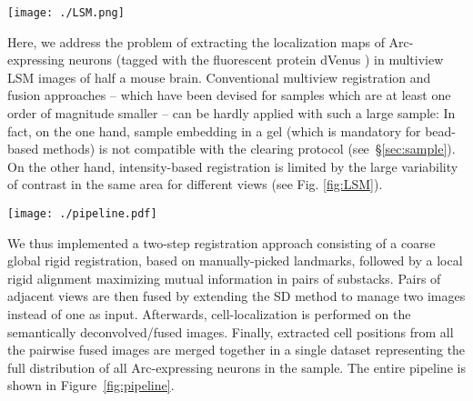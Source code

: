 \documentclass[smallextended]{svjour3}       %
\begin{document}
\begin{figure*}
\centering
\texttt{[image: ./LSM.png]}
\caption{Image degradation in LSM. (a) both excitation (solid arrow) and fluorescence light (dashed arrow)
are scattered and absorbed while traveling inside the specimen, leading to image degradation along two
orthogonal axes. (b) virtual coronal sections of half a mouse brain imaged with LSM at different angles.
The direction of the ingoing excitation light and of the outgoing fluorescence are depicted with solid and
dashed arrows, respectively. Scale bars, 1 mm.}
\label{fig:LSM}
\end{figure*}

Here, we address the problem of extracting the localization maps of Arc-expressing neurons (tagged with
the fluorescent protein dVenus \cite{eguchi_vivo_2009}) in multiview LSM images of half a mouse brain.
Conventional multiview registration and fusion approaches -- which have been devised for samples which
are at least one order of magnitude smaller -- can be hardly applied with such a large sample: In fact,
on the one hand, sample embedding in a gel (which is mandatory for bead-based methods) is not compatible
with the clearing protocol (see~\S\ref{sec:sample}). On the other hand, intensity-based registration is
limited by the large variability of contrast in the same area for different views (see Fig. \ref{fig:LSM}).

\begin{figure*}
  \centering
  \texttt{[image: ./pipeline.pdf]}
  \caption{Overall processing pipeline for cell identification. $d^\circ_\perp$ and $d^\circ_\top$ (for $d=90,270$) denote
    substacks from the $d^\circ$ view aligned to the $0^\circ$ and the $180^\circ$ references, respectively.}
  \label{fig:pipeline}
\end{figure*}

We thus implemented a two-step registration approach consisting of a coarse global rigid registration, based
on manually-picked landmarks, followed by a local rigid alignment maximizing mutual information in pairs of substacks.
Pairs of adjacent views are then fused by extending the SD method to manage two images instead of one
as input. Afterwards, cell-localization is performed on the semantically deconvolved/fused images. Finally,
extracted cell positions from all the pairwise fused images are merged together in a single dataset
representing the full distribution of all Arc-expressing neurons in the sample. The entire pipeline is shown
in Figure~\ref{fig:pipeline}.
\end{document}
